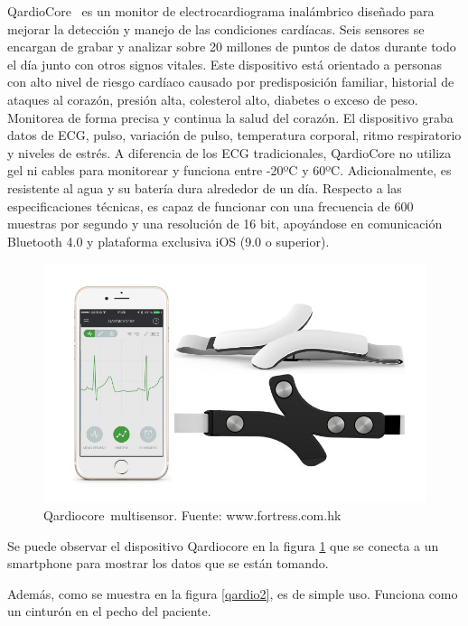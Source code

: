 QardioCore\textregistered\ \cite{qardio} es un monitor de electrocardiograma inalámbrico diseñado para mejorar la detección y manejo de las condiciones cardíacas. Seis sensores se encargan de grabar y analizar sobre 20 millones de puntos de datos durante todo el día junto con otros signos vitales. Este dispositivo está orientado a personas con alto nivel de riesgo cardíaco causado por predisposición familiar, historial de ataques al corazón, presión alta, colesterol alto, diabetes o exceso de peso. Monitorea de forma precisa y continua la salud del corazón. El dispositivo graba datos de ECG, pulso, variación de pulso, temperatura corporal, ritmo respiratorio y niveles de estrés. A diferencia de los ECG tradicionales, QardioCore no utiliza gel ni cables para monitorear y funciona entre -20ºC y 60ºC. Adicionalmente, es resistente al agua y su batería dura alrededor de un día. Respecto a las especificaciones técnicas, es capaz de funcionar con una frecuencia de 600 muestras por segundo y una resolución de 16 bit, apoyándose en comunicación Bluetooth 4.0 y plataforma exclusiva iOS (9.0 o superior)\cite{qardio_tel}.

\begin{figure}[H]
	\centering
	\includegraphics[scale=0.5]{figuras/estadoarte/qardio/qardio.jpg}
	\caption{Qardiocore\textregistered\ multisensor. Fuente: www.fortress.com.hk}
	\label{qardio1}
\end{figure}

Se puede observar el dispositivo Qardiocore en la figura \ref{qardio1} que se conecta a un smartphone para mostrar los datos que se están tomando.

\newpage
Además, como se muestra en la figura \ref{qardio2}, es de simple uso. Funciona como un cinturón en el pecho del paciente.

